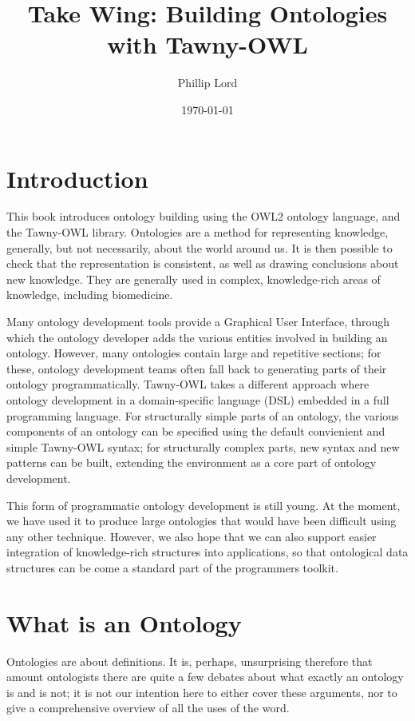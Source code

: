 \documentclass[11pt]{article}
\author{Phillip Lord}
\date{\today}
\title{Take Wing: Building Ontologies with Tawny-OWL}
\begin{document}
\maketitle
\tableofcontents


\section{Introduction}
\label{sec-1}

This book introduces ontology building using the OWL2 ontology language, and
the Tawny-OWL library. Ontologies are a method for representing knowledge,
generally, but not necessarily, about the world around us. It is then possible
to check that the representation is consistent, as well as drawing conclusions
about new knowledge. They are generally used in complex, knowledge-rich areas
of knowledge, including biomedicine.

Many ontology development tools provide a Graphical User Interface, through
which the ontology developer adds the various entities involved in building an
ontology. However, many ontologies contain large and repetitive sections; for
these, ontology development teams often fall back to generating parts of their
ontology programmatically. Tawny-OWL takes a different approach where ontology
development in a domain-specific language (DSL) embedded in a full programming
language. For structurally simple parts of an ontology, the various components
of an ontology can be specified using the default convienient and simple
Tawny-OWL syntax; for structurally complex parts, new syntax and new patterns
can be built, extending the environment as a core part of ontology
development.

This form of programmatic ontology development is still young. At the moment,
we have used it to produce large ontologies that would have been difficult
using any other technique. However, we also hope that we can also support
easier integration of knowledge-rich structures into applications, so that
ontological data structures can be come a standard part of the programmers
toolkit.


\section{What is an Ontology}
\label{sec-2}
\label{what_is_an_ontology}

Ontologies are about definitions. It is, perhaps, unsurprising therefore
that amount ontologists there are quite a few debates about what exactly
an ontology is and is not; it is not our intention here to either cover
these arguments, nor to give a comprehensive overview of all the uses of
the word.
\end{document}
